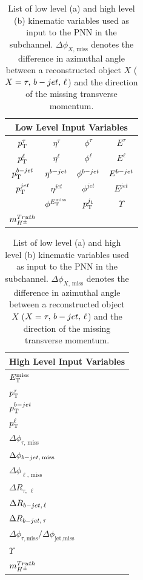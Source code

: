       \begin{table}[!thp]
				\begin{subtable}[c]{0.25\textwidth}
					\centering
					\begin{tabular}{| c | c | c | c |}
		        \multicolumn{4}{c}{\textbf{Low Level Input Variables}} \\ \hline \hline
		        $p_{\text{T}}^{\tau}$ & $\eta^{\tau}$ & $\phi^{\tau}$ & $E^{\tau}$ \\ \hline
		        $p_{\text{T}}^{\ell}$ & $\eta^{\ell}$ & $\phi^{\ell}$ & $E^{\ell}$ \\ \hline
		        $p_{\text{T}}^{b-jet}$ & $\eta^{b-jet}$ & $\phi^{b-jet}$ & $E^{b-jet}$ \\ \hline
		        $p_{\text{T}}^{jet}$ & $\eta^{jet}$ & $\phi^{jet}$ & $E^{jet}$ \\ \hline
		        \Etm & $\phi^{E_\text{T}^\text{miss}}$ & $p_{\text{T}}^{j_{1}}$ & $\Upsilon$  \\ \hline
		        $m_{H^{\pm}}^{Truth}$ & & & \\ \hline 
	        \end{tabular}
	      \end{subtable}

				\begin{subtable}[c]{0.25\textwidth}
					\centering
					\begin{tabular}{| l |}
						\hline
						\textbf{High Level Input Variables} \\
						\hline \hline
						$E_\text{T}^\text{miss}$  \\
						$p_{\text{T}}^{\tau}$  \\
						$p_{\text{T}}^{b-jet}$  \\
						$p_{\text{T}}^{\ell}$  \\
						$\Delta \phi_{\tau,\,\text{miss}}$  \\
						$\Delta \phi_{b-jet,\,\text{miss}}$  \\
						$\Delta \phi_{\ell,\,\text{miss}}$  \\
						$\Delta R_{\tau,\,\ell}$ \\
						$\Delta R_{b-jet,\,\ell}$ \\
						$\Delta R_{b-jet,\,\tau}$ \\
						$\Delta \phi_{\tau, \text{miss}} / \Delta \phi_{\text{jet}, \text{miss}}$  \\
						$\Upsilon$ \\
						$m_{H^{\pm}}^{Truth}$ \\ \hline
					\end{tabular}
				\end{subtable}
				\caption{List of low level (a) and high level (b) kinematic variables used as input to the PNN in the \taulep subchannel. $\Delta \phi_{X,\,\text{miss}}$ denotes the difference in azimuthal angle between a reconstructed object $X$ ($X = \tau,\,b-jet,\,\ell$) and the direction of the missing transverse momentum.}
				\label{tab:taulep-input-variables-high-v-low}
			\end{table}

